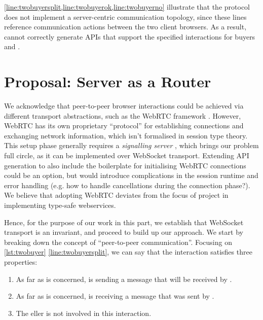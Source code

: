 \cref{line:twobuyersplit,line:twobuyerok,line:twobuyerno}
illustrate that the  protocol 
does not implement a server-centric communication topology,
since these lines reference communication actions between
the two client browsers. 
As a result,  cannot correctly generate
APIs that support the specified interactions 
for buyers  and .

\section{Proposal: Server as a Router}
\label{section:routerapproach}

We acknowledge that peer-to-peer browser interactions
could be achieved via different transport abstractions, 
such as the WebRTC framework \cite{WebRTC}. 
However, WebRTC has its own proprietary ``protocol'' 
for establishing connections and exchanging network information,
which isn't formalised in session type theory. This setup phase
generally requires a \textit{signalling server} \cite{WebRTCSignaling},
which brings our problem full circle, as it can be implemented
over WebSocket transport. Extending API generation to also include
the boilerplate for initialising WebRTC connections could be an option,
but would introduce complications in the session runtime and
error handling (e.g. how to handle cancellations during the connection
phase?).
We believe that adopting WebRTC deviates from the focus of project in 
implementing type-safe webservices.

Hence, for the purpose of our work in this part,
we establish that WebSocket transport is an invariant, 
and proceed to build up our approach. 
We start by breaking down the concept of 
``peer-to-peer communication''.
Focusing on \cref{lst:twobuyer} \cref{line:twobuyersplit},
we can say that the interaction satisfies three properties:

\begin{enumerate}
\item 
As far as  is concerned,  is sending
a message that will be received by .

\item
As far as  is concerned,  is receiving
a message that was sent by .

\item
The eller is not involved in this interaction.
\end{enumerate}

